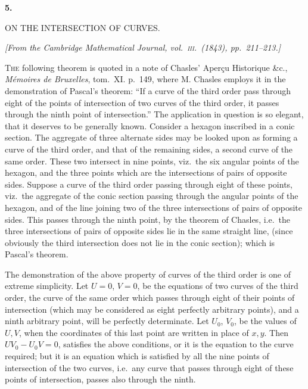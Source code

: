 \documentclass[11pt]{article}
\begin{document}
\clearpage


\begin{center}
{\Large\textbf{5.}}\par
\bigskip
{\Large ON THE INTERSECTION OF CURVES.}
\end{center}

\medskip
\begin{center}
\textit{[From the Cambridge Mathematical Journal, vol.\ \textsc{iii}.\ (1843), pp.~211--213.]}
\end{center}

\bigskip

\noindent\textsc{The} following theorem is quoted in a note of Chasles' Aper\c{c}u Historique \&c.,
\textit{M\'emoires de Bruxelles}, tom.~XI. p.~149, where M. Chasles employs it in the
demonstration of Pascal's theorem: ``If a curve of the third order pass through eight
of the points of intersection of two curves of the third order, it passes through the
ninth point of intersection.'' The application in question is so elegant, that it deserves
to be generally known. Consider a hexagon inscribed in a conic section. The aggregate
of three alternate sides may be looked upon as forming a curve of the third order, and
that of the remaining sides, a second curve of the same order. These two intersect in
nine points, viz.\ the six angular points of the hexagon, and the three points which are
the intersections of pairs of opposite sides. Suppose a curve of the third order passing
through eight of these points, viz.\ the aggregate of the conic section passing through
the angular points of the hexagon, and of the line joining two of the three intersections
of pairs of opposite sides. This passes through the ninth point, by the theorem of
Chasles, i.e.\ the three intersections of pairs of opposite sides lie in the same straight
line, (since obviously the third intersection does not lie in the conic section); which is
Pascal's theorem.

The demonstration of the above property of curves of the third order is one of
extreme simplicity. Let $U=0$, $V=0$, be the equations of two curves of the third
order, the curve of the same order which passes through eight of their points of
intersection (which may be considered as eight perfectly arbitrary points), and a ninth
arbitrary point, will be perfectly determinate. Let $U_0$, $V_0$, be the values of $U,V$,
when the coordinates of this last point are written in place of $x,y$. Then
$UV_0-U_0V=0$, satisfies the above conditions, or it is the equation to the curve
required; but it is an equation which is satisfied by all the nine points of intersection
of the two curves, i.e.\ any curve that passes through eight of these points of
intersection, passes also through the ninth.
\end{document}
